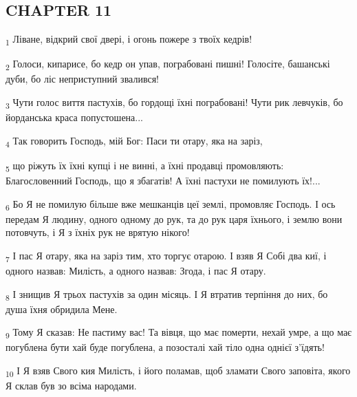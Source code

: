\subsection{CHAPTER 11}
\begin{tcolorbox}
\textsubscript{1} Ліване, відкрий свої двері, і огонь пожере з твоїх кедрів!
\end{tcolorbox}
\begin{tcolorbox}
\textsubscript{2} Голоси, кипарисе, бо кедр он упав, пограбовані пишні! Голосіте, башанські дуби, бо ліс неприступний звалився!
\end{tcolorbox}
\begin{tcolorbox}
\textsubscript{3} Чути голос виття пастухів, бо гордощі їхні пограбовані! Чути рик левчуків, бо йорданська краса попустошена...
\end{tcolorbox}
\begin{tcolorbox}
\textsubscript{4} Так говорить Господь, мій Бог: Паси ти отару, яка на заріз,
\end{tcolorbox}
\begin{tcolorbox}
\textsubscript{5} що ріжуть їх їхні купці і не винні, а їхні продавці промовляють: Благословенний Господь, що я збагатів! А їхні пастухи не помилують їх!...
\end{tcolorbox}
\begin{tcolorbox}
\textsubscript{6} Бо Я не помилую більше вже мешканців цеї землі, промовляє Господь. І ось передам Я людину, одного одному до рук, та до рук царя їхнього, і землю вони потовчуть, і Я з їхніх рук не врятую нікого!
\end{tcolorbox}
\begin{tcolorbox}
\textsubscript{7} І пас Я отару, яка на заріз тим, хто торгує отарою. І взяв Я Собі два киї, і одного назвав: Милість, а одного назвав: Згода, і пас Я отару.
\end{tcolorbox}
\begin{tcolorbox}
\textsubscript{8} І знищив Я трьох пастухів за один місяць. І Я втратив терпіння до них, бо душа їхня обридила Мене.
\end{tcolorbox}
\begin{tcolorbox}
\textsubscript{9} Тому Я сказав: Не пастиму вас! Та вівця, що має померти, нехай умре, а що має погублена бути хай буде погублена, а позосталі хай тіло одна однієї з'їдять!
\end{tcolorbox}
\begin{tcolorbox}
\textsubscript{10} І Я взяв Свого кия Милість, і його поламав, щоб зламати Свого заповіта, якого Я склав був зо всіма народами.
\end{tcolorbox}
